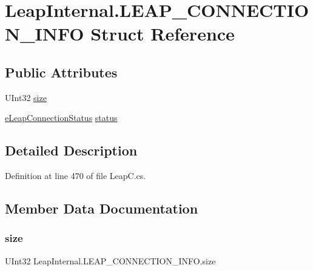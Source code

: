 \hypertarget{struct_leap_internal_1_1_l_e_a_p___c_o_n_n_e_c_t_i_o_n___i_n_f_o}{}\section{Leap\+Internal.\+L\+E\+A\+P\+\_\+\+C\+O\+N\+N\+E\+C\+T\+I\+O\+N\+\_\+\+I\+N\+FO Struct Reference}
\label{struct_leap_internal_1_1_l_e_a_p___c_o_n_n_e_c_t_i_o_n___i_n_f_o}
\subsection*{Public Attributes}
\begin{DoxyCompactItemize}
\item 
U\+Int32 \mbox{\hyperlink{struct_leap_internal_1_1_l_e_a_p___c_o_n_n_e_c_t_i_o_n___i_n_f_o_a5428e50901ec7335e8450706a26e180a}{size}}
\item 
\mbox{\hyperlink{namespace_leap_internal_a98a6a4220fcab393d11bf4ec2eecdea6}{e\+Leap\+Connection\+Status}} \mbox{\hyperlink{struct_leap_internal_1_1_l_e_a_p___c_o_n_n_e_c_t_i_o_n___i_n_f_o_a3d12b72914f3b4bf9b536a6a429cfdbc}{status}}
\end{DoxyCompactItemize}


\subsection{Detailed Description}


Definition at line 470 of file Leap\+C.\+cs.



\subsection{Member Data Documentation}
\mbox{\label{struct_leap_internal_1_1_l_e_a_p___c_o_n_n_e_c_t_i_o_n___i_n_f_o_a5428e50901ec7335e8450706a26e180a}} 
\subsubsection{\texorpdfstring{size}{size}}
{\footnotesize\ttfamily U\+Int32 Leap\+Internal.\+L\+E\+A\+P\+\_\+\+C\+O\+N\+N\+E\+C\+T\+I\+O\+N\+\_\+\+I\+N\+F\+O.\+size}



